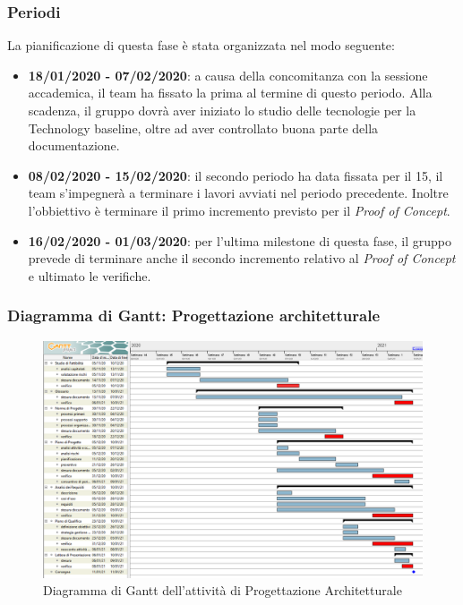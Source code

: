 \subsubsection{Periodi}
La pianificazione di questa fase è stata organizzata nel modo seguente:
\begin{itemize}
\item \textbf{18/01/2020 - 07/02/2020}: a causa della concomitanza con la sessione accademica, il team ha fissato la prima  al termine di questo periodo. Alla scadenza, il gruppo dovrà aver iniziato lo studio delle tecnologie per la Technology baseline, oltre ad aver controllato buona parte della documentazione.

\item \textbf{08/02/2020 - 15/02/2020}: il secondo periodo ha data fissata per il 15, il team s'impegnerà a terminare i lavori avviati nel periodo precedente. Inoltre l'obbiettivo è terminare il primo incremento previsto per il \textit{Proof of Concept}.

\item \textbf{16/02/2020 - 01/03/2020}: per l'ultima milestone di questa fase, il gruppo prevede di terminare anche il secondo incremento relativo al \textit{Proof of Concept} e ultimato le verifiche.
\end{itemize}

\subsubsection{Diagramma di Gantt: Progettazione architetturale}
\begin{figure}[h]
	\includegraphics[scale=0.45]{Images/GanttPianificazioneAnalisi.PNG}
	\caption{Diagramma di Gantt dell'attività di Progettazione Architetturale}
\end{figure}